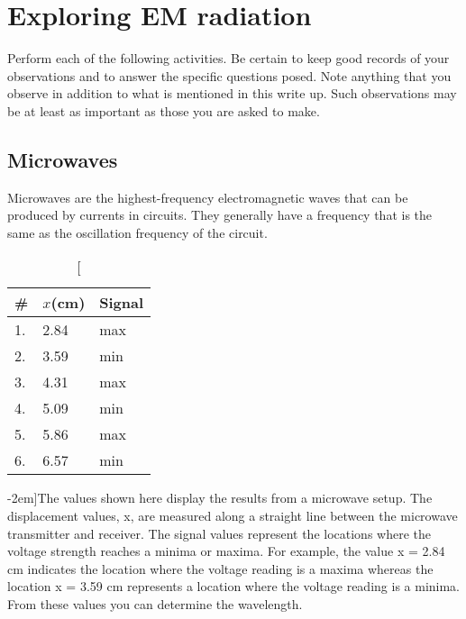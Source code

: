 \section{Exploring EM radiation}
Perform each of the following activities.  Be certain to keep good records of your observations and to answer the specific questions posed.  Note anything that you observe in addition to what is mentioned in this write up.  Such observations may be at least as important as those you are asked to make.

\subsection{Microwaves}
Microwaves are the highest-frequency electromagnetic waves that can be produced by currents in circuits.  They generally have a frequency that is the same as the oscillation frequency of the circuit.

\begin{table}
\centering
\begin{tabular}{l l l}\toprule
\# & $x$(cm) & Signal\\
\midrule
1.	&	2.84 &	max\\
2.	&	3.59 &	min\\
3.	&	4.31	 &	max	\\
4.	&	5.09 &	min\\
5.	&	5.86 &	max\\
6.	&	6.57	 &	min\\
\bottomrule
\end{tabular}
\label{t:microwavesignal}
\caption[Microwave Peak Signal][-2em]{The values shown here display the results from a microwave setup. The displacement values, x, are measured along a straight line between the microwave transmitter and receiver. The signal values represent the locations where the voltage strength reaches a minima or maxima. For example, the value x = 2.84 cm indicates the location where the voltage reading is a maxima whereas the location x = 3.59 cm represents a location where the voltage reading is a minima. From these values you can determine the wavelength.}
\end{table}

